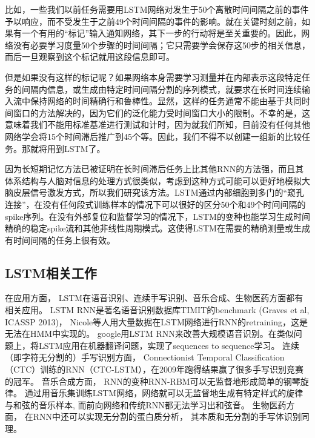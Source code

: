 比如，一些我们以前任务需要用LSTM网络对发生于50个离散时间间隔之前的事件予以响应，而不受发生于之前49个时间间隔的事件的影响。就在关键时刻之前，如果有一个有用的“标记”输入通知网络，其下一步的行动将是至关重要的。因此，网络没有必要学习度量50个步骤的时间间隔；它只需要学会保存这50步的相关信息，而后一旦观察到这个标记就用这段信息即可。

但是如果没有这样的标记呢？如果网络本身需要学习测量并在内部表示这段特定任务的间隔内信息，或生成由特定时间间隔分割的序列模式，就要求在长时间连续输入流中保持网络的时间精确行和鲁棒性。显然，这样的任务通常不能由基于共同时间窗口的方法解决的，因为它们的泛化能力受时间窗口大小的限制。不幸的是，这意味着我们不能用标准基准进行测试和计时，因为就我们所知，目前没有任何其他网络学会将15个时间滞后推广到45个等。因此，我们不得不以创建一组新的比较任务。那就将用到LSTM了。

因为长短期记忆方法已被证明在长时间滞后任务上比其他RNN的方法强，而且其体系结构与人脑对信息的处理方式很类似，考虑到这种方式可能可以更好地模拟大脑皮层信号激发方式，所以我们研究该方法。LSTM通过内部细胞到多门的“窥孔连接”，在没有任何段式训练样本的情况下可以很好的区分50个和49个时间间隔的spike序列。在没有外部复位和监督学习的情况下，LSTM的变种也能学习生成时间精确的稳定spike流和其他非线性周期模式。这使得LSTM在需要的精确测量或生成有时间间隔的任务上很有效。


\subsection{LSTM相关工作}

在应用方面， LSTM在语音识别、连续手写识别、音乐合成、生物医药方面都有相关应用。 LSTM RNN是著名语音识别数据库TIMIT的benchmark (Graves et al, ICASSP 2013)， Nicole等人用大量数据在LSTM网络进行RNN的retraining\cite{beringer2005classifying}，这是无法在HMM中实现的。 google用LSTM RNN来改善大规模语音识别\cite{sak2014long}。在类似问题上，\cite{sutskever2014sequence}将LSTM应用在机器翻译问题，实现了sequences to sequence学习。 连续（即字符无分割的）手写识别方面，  Connectionist Temporal Classification（CTC）\cite{graves2012connectionist}训练的RNN（CTC-LSTM）\cite{bluche2014a2ia}，在2009年跑得结果赢了很多手写识别竞赛的冠军\cite{graves2006connectionist}。 音乐合成方面， RNN的变种RNN-RBM可以无监督地形成简单的钢琴旋律\cite{boulanger2012modeling}。 通过用音乐集训练LSTM网络，网络就可以无监督地生成有特定样式的旋律与和弦的音乐样本, 而前向网络和传统RNN都无法学习出和弦音\cite{eck2002first}。 生物医药方面， 在RNN中还可以实现无分割的蛋白质分析\cite{hochreiter2007fast}， 其本质和无分割的手写体识别同理。





